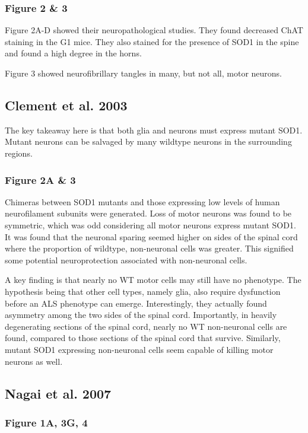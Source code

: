 \documentclass[12pt]{report}
\begin{document}
\subsubsection{Figure 2 \& 3} 
Figure 2A-D showed their neuropathological studies. They found decreased ChAT staining in the G1 mice. They also stained for the presence of SOD1 in the spine and found a high degree in the horns. 

Figure 3 showed neurofibrillary tangles in many, but not all, motor neurons. 


\subsection{Clement et al. 2003}

The key takeaway here is that both glia and neurons must express mutant SOD1. Mutant neurons can be salvaged by many wildtype neurons in the surrounding regions. 

\subsubsection{Figure 2A \& 3}
Chimeras between SOD1 mutants and those expressing low levels of human neurofilament subunits were generated. Loss of motor neurons was found to be symmetric, which was odd considering all motor neurons express mutant SOD1. It was found that the neuronal sparing seemed higher on sides of the spinal cord where the proportion of wildtype, non-neuronal cells was greater. This signified some potential neuroprotection associated with non-neuronal cells.\newline

A key finding is that nearly no WT motor cells may still have no phenotype. The hypothesis being that other cell types, namely glia, also require dysfunction before an ALS phenotype can emerge. Interestingly, they actually found asymmetry among the two sides of the spinal cord. Importantly, in heavily degenerating sections of the spinal cord, nearly no WT non-neuronal cells are found, compared to those sections of the spinal cord that survive. Similarly, mutant SOD1 expressing non-neuronal cells seem capable of killing motor neurons as well. 


\subsection{Nagai et al. 2007}

\subsubsection{Figure 1A, 3G, 4}
\end{document}
